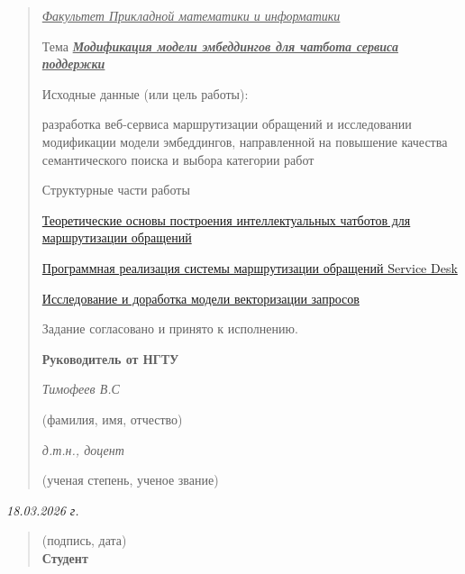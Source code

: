 \documentclass[
]{article}
\begin{document}
\begin{quote}
\emph{\ul{Факультет Прикладной математики и информатики}}

Тема \emph{\textbf{\ul{Модификация модели эмбеддингов для чатбота
сервиса поддержки}}}

Исходные данные (или цель работы):

разработка веб-сервиса маршрутизации обращений и исследовании
модификации модели эмбеддингов, направленной на повышение качества
семантического поиска и выбора категории работ

Структурные части работы

\protect\hyperlink{ux442ux435ux43eux440ux435ux442ux438ux447ux435ux441ux43aux438ux435-ux43eux441ux43dux43eux432ux44b-ux43fux43eux441ux442ux440ux43eux435ux43dux438ux44f-ux438ux43dux442ux435ux43bux43bux435ux43aux442ux443ux430ux43bux44cux43dux44bux445-ux447ux430ux442ux431ux43eux442ux43eux432-ux434ux43bux44f-ux43cux430ux440ux448ux440ux443ux442ux438ux437ux430ux446ux438ux438-ux43eux431ux440ux430ux449ux435ux43dux438ux439}{Теоретические
основы построения интеллектуальных чатботов для маршрутизации обращений}

\protect\hyperlink{ux43fux440ux43eux433ux440ux430ux43cux43cux43dux430ux44f-ux440ux435ux430ux43bux438ux437ux430ux446ux438ux44f-ux441ux438ux441ux442ux435ux43cux44b-ux43cux430ux440ux448ux440ux443ux442ux438ux437ux430ux446ux438ux438-ux43eux431ux440ux430ux449ux435ux43dux438ux439-service-desk}{Программная
реализация системы маршрутизации обращений Service Desk}

\protect\hyperlink{ux438ux441ux441ux43bux435ux434ux43eux432ux430ux43dux438ux435-ux438-ux434ux43eux440ux430ux431ux43eux442ux43aux430-ux43cux43eux434ux435ux43bux438-ux432ux435ux43aux442ux43eux440ux438ux437ux430ux446ux438ux438-ux437ux430ux43fux440ux43eux441ux43eux432}{Исследование
и доработка модели векторизации запросов}

Задание согласовано и принято к исполнению.

\textbf{Руководитель от НГТУ}

\emph{Тимофеев В.С}

(фамилия, имя, отчество)

\emph{д.т.н., доцент}

(ученая степень, ученое звание)
\end{quote}

\emph{18.03.2026 г.}

\begin{quote}
(подпись, дата)\\
\textbf{Студент}
\end{quote}
\end{document}
